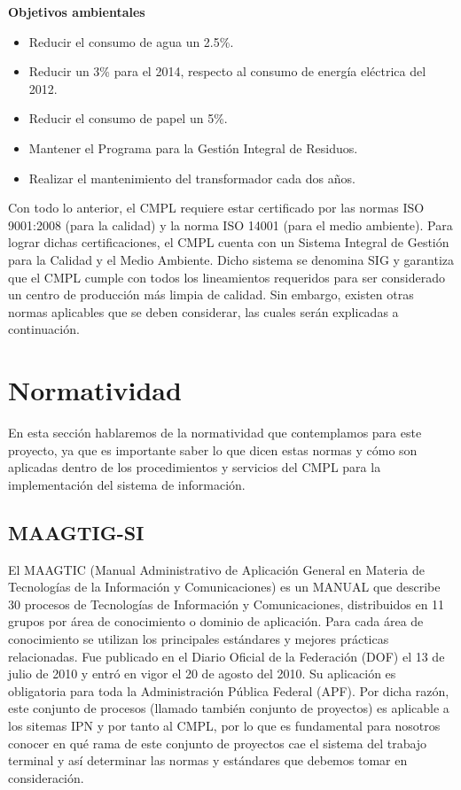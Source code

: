 \textbf{Objetivos ambientales}

\begin{itemize}
	\item Reducir el consumo de agua un 2.5\%.
	\item Reducir un 3\% para el 2014, respecto al consumo de energía eléctrica del 2012.
	\item Reducir el consumo de papel un 5\%.
	\item Mantener el Programa para la Gestión Integral de Residuos.
	\item Realizar el mantenimiento del transformador cada dos años.
\end{itemize}

	Con todo lo anterior, el CMPL requiere estar certificado por las normas ISO 9001:2008 (para la calidad) y la norma ISO 14001 (para el medio ambiente). Para lograr dichas certificaciones, el CMPL cuenta con un Sistema Integral de Gestión para la Calidad y el Medio Ambiente. Dicho sistema se denomina SIG y garantiza que el CMPL cumple con todos los lineamientos requeridos para ser considerado un centro de producción más limpia de calidad. Sin embargo, existen otras normas aplicables que se deben considerar, las cuales serán explicadas a continuación.
	
\section{Normatividad}
	En esta sección hablaremos de la normatividad que contemplamos para este proyecto, ya que es importante saber lo que dicen estas normas y cómo son aplicadas dentro de los procedimientos y servicios del CMPL para la implementación del sistema de información.\\
	
	\subsection{MAAGTIG-SI}%
	El MAAGTIC (Manual Administrativo de Aplicación General en Materia de Tecnologías de la Información y Comunicaciones) es un MANUAL que describe 30 procesos de Tecnologías de Información y Comunicaciones, distribuidos en 11 grupos por área de conocimiento o dominio de aplicación. Para cada área de conocimiento se utilizan los principales estándares y mejores prácticas relacionadas\cite{MAAGTICSI}. Fue publicado en el Diario Oficial de la Federación (DOF) el 13 de julio de 2010 y entró en vigor el 20 de agosto del 2010. Su aplicación es obligatoria para toda la Administración Pública Federal (APF). Por dicha razón, este conjunto de procesos (llamado también conjunto de proyectos) es aplicable a los sitemas IPN y por tanto al CMPL, por lo que es fundamental para nosotros conocer en qué rama de este conjunto de proyectos cae el sistema del trabajo terminal y así determinar las normas y estándares que debemos tomar en consideración.\\
	
